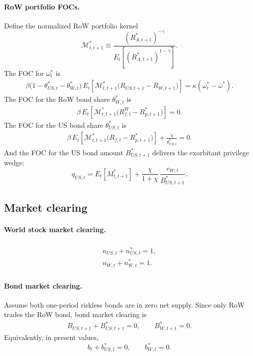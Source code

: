 \documentclass[12pt]{article}
\theoremstyle{plain}
\begin{document}
\paragraph{RoW portfolio FOCs.}
Define the normalized RoW portfolio kernel
\[
\mathcal M_{t,t+1}^* \equiv \frac{(R_{A,t+1}^*)^{-\gamma}}{E_t\!\left[(R_{A,t+1}^*)^{1-\gamma}\right]}.
\]
The FOC for $\omega_t^*$ is
\begin{align}\label{RoW_omega_FOC_mod}
\beta\bigl(1-\theta_{US,t}^*-\theta_{W,t}^*\bigr)\,
E_t\!\left[\mathcal M_{t,t+1}^*\bigl(R_{US,t+1}-R_{W,t+1}\bigr)\right]
=
\kappa(\omega_t^*-\bar\omega^*).
\end{align}
The FOC for the RoW bond share $\theta_{W,t}^*$ is
\begin{align}\label{RoW_thetaW_FOC_mod}
\beta\,E_t\!\left[\mathcal M_{t,t+1}^*\bigl(R_{f,t}^W-R_{p,t+1}^*\bigr)\right]
=
0.
\end{align}
The FOC for the US bond share $\theta_{US,t}^*$ is
\begin{align}\label{RoW_thetaUS_FOC_mod}
\beta\,E_t\!\left[\mathcal M_{t,t+1}^*\bigl(R_{f,t}-R_{p,t+1}^*\bigr)\right]
+\frac{\chi}{\theta_{US,t}^*}
=
0.
\end{align}
And the FOC for the US bond amount $B_{US,t+1}^*$ delivers the exorbitant privilege wedge:
\[
q_{US,t}
=
E_t\!\left[M^*_{t,t+1}\right]
+\frac{\chi}{1+\chi}\,\frac{e_{W,t}}{B^*_{US,t+1}}.
\]

\subsection{Market clearing}

\paragraph{World stock market clearing.}
\begin{align}\label{stock_clear_mod}
\begin{split}
n_{US,t}+n^*_{US,t}=1,\\
n_{W,t}+n^*_{W,t}=1.
\end{split}
\end{align}

\paragraph{Bond market clearing.}
Assume both one-period riskless bonds are in zero net supply. Since only RoW trades the RoW bond, bond market
clearing is
\begin{align}\label{bond_clear_mod_zerosupply}
B_{US,t+1}+B^*_{US,t+1}=0,
\qquad
B^*_{W,t+1}=0.
\end{align}
Equivalently, in present values,
\[
b_t+b_{US,t}^*=0,
\qquad
b_{W,t}^*=0.
\]
\end{document}
